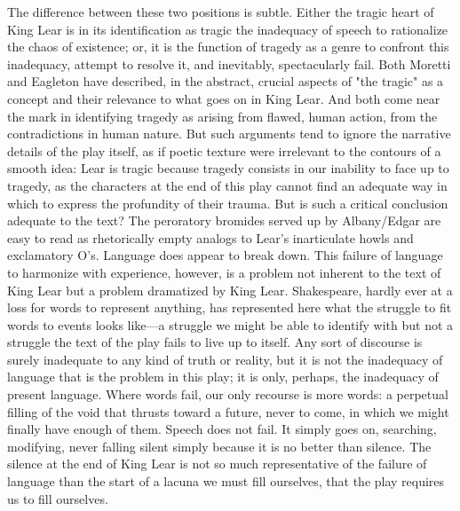 The difference between these two positions is subtle. Either the tragic heart of King Lear is in its identification as tragic the inadequacy of speech to rationalize the chaos of existence; or, it is the function of tragedy as a genre to confront this inadequacy, attempt to resolve it, and inevitably, spectacularly fail. Both Moretti and Eagleton have described, in the abstract, crucial aspects of "the tragic" as a concept and their relevance to what goes on in King Lear. And both come near the mark in identifying tragedy as arising from flawed, human action, from the contradictions in human nature. But such arguments tend to ignore the narrative details of the play itself, as if poetic texture were irrelevant to the contours of a smooth idea: Lear is tragic because tragedy consists in our inability to face up to tragedy, as the characters at the end of this play cannot find an adequate way in which to express the profundity of their trauma. But is such a critical conclusion adequate to the text? The peroratory bromides served up by Albany/Edgar are easy to read as rhetorically empty analogs to Lear's inarticulate howls and exclamatory O's. Language does appear to break down. This failure of language to harmonize with experience, however, is a problem not inherent to the text of King Lear but a problem dramatized by King Lear. Shakespeare, hardly ever at a loss for words to represent anything, has represented here what the struggle to fit words to events looks like—a struggle we might be able to identify with but not a struggle the text of the play fails to live up to itself. Any sort of discourse is surely inadequate to any kind of truth or reality, but it is not the inadequacy of language that is the problem in this play; it is only, perhaps, the inadequacy of present language. Where words fail, our only recourse is more words: a perpetual filling of the void that thrusts toward a future, never to come, in which we might finally have enough of them. Speech does not fail. It simply goes on, searching, modifying, never falling silent simply because it is no better than silence. The silence at the end of King Lear is not so much representative of the failure of language than the start of a lacuna we must fill ourselves, that the play requires us to fill ourselves.

